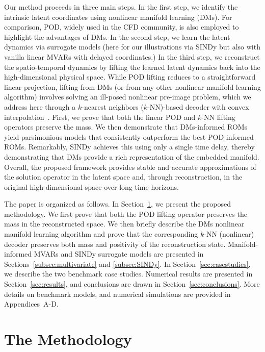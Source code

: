 \documentclass{article}
\begin{document}
Our method proceeds in three main steps. In the first step, we identify the intrinsic latent coordinates using nonlinear manifold learning (DMs). For comparison, 
POD, widely used in the CFD community, is also employed to highlight the advantages of DMs. In the second step, we learn the latent dynamics via surrogate models (here for our illustrations via SINDy but also with vanilla linear MVARs with delayed coordinates.) In the third step, we reconstruct the spatio-temporal dynamics by lifting the learned latent dynamics back into the high-dimensional physical space. While POD lifting reduces to a straightforward linear projection, lifting from DMs (or from any other nonlinear manifold learning algorithm) involves solving an ill-posed nonlinear pre-image problem, which we address here through a $k$-nearest neighbors ($k$-NN)-based decoder with convex interpolation~\cite{chin2024enabling}. First, we prove that both the linear POD and $k$-NN lifting operators preserve the mass. We then demonstrate that DMs-informed ROMs yield parsimonious models that consistently outperform the best POD-informed ROMs. Remarkably, SINDy achieves this using only a single time delay, thereby demonstrating that DMs provide a rich representation of the embedded manifold. Overall, the proposed framework provides stable and accurate approximations of the solution operator in the latent space and, through reconstruction, in the original high-dimensional space over long time horizons.

The paper is organized as follows. In Section~\ref{sec:three-tier}, we present the proposed methodology. We first prove that both the POD lifting operator preserves the mass in the reconstructed space. We then briefly describe the DMs nonlinear manifold learning algorithm and prove that the corresponding $k$-NN (nonlinear) decoder preserves both mass and positivity of the reconstruction state. Manifold-informed MVARs and SINDy surrogate models are presented in Sections~\ref{subsec:multivariate} and \ref{subsec:SINDy}. In Section~\ref{sec:casestudies}, we describe the two benchmark case studies. 
Numerical results are presented in Section~\ref{sec:results}, and conclusions are drawn in Section~\ref{sec:conclusions}. 
More details on benchmark models, and numerical simulations are provided in Appendices~A-D.

\section{The Methodology}
\label{sec:three-tier}
\end{document}
